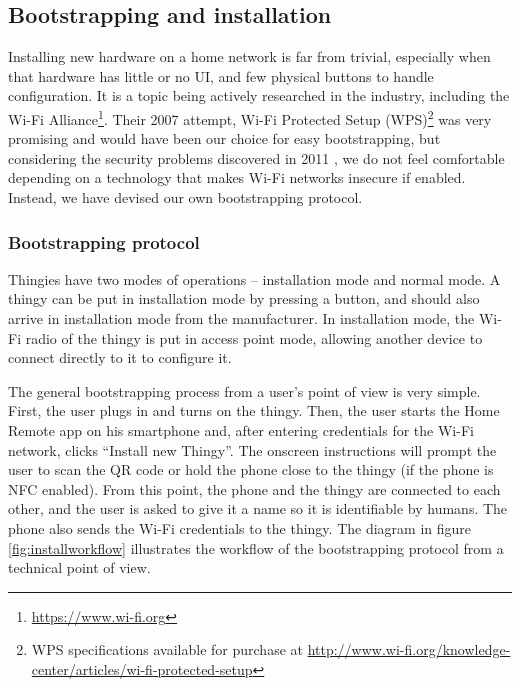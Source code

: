 \documentclass{ubicomp2012}
\begin{document}
\subsection{Bootstrapping and installation}

Installing new hardware on a home network is far from trivial, especially when that hardware has little or no UI, and few physical buttons to handle configuration. It is a topic being actively researched in the industry, including the Wi-Fi Alliance\footnote{\url{https://www.wi-fi.org}}. Their 2007 attempt, Wi-Fi Protected Setup (WPS)\footnote{WPS specifications available for purchase at \url{http://www.wi-fi.org/knowledge-center/articles/wi-fi-protected-setup}\texttrademark} was very promising and would have been our choice for easy bootstrapping, but considering the security problems discovered in 2011 \cite{StefanWPS}, we do not feel comfortable depending on a technology that makes Wi-Fi networks insecure if enabled. Instead, we have devised our own bootstrapping protocol.

\subsubsection{Bootstrapping protocol}

Thingies have two modes of operations -- installation mode and normal mode. A thingy can be put in installation mode by pressing a button, and should also arrive in installation mode from the manufacturer. In installation mode, the Wi-Fi radio of the thingy is put in access point mode, allowing another device to connect directly to it to configure it.

The general bootstrapping process from a user's point of view is very simple. First, the user plugs in and turns on the thingy. Then, the user starts the Home Remote app on his smartphone and, after entering credentials for the Wi-Fi network, clicks ``Install new Thingy''. The onscreen instructions will prompt the user to scan the QR code or hold the phone close to the thingy (if the phone is NFC enabled). From this point, the phone and the thingy are connected to each other, and the user is asked to give it a name so it is identifiable by humans. The phone also sends the Wi-Fi credentials to the thingy. The diagram in figure \ref{fig:installworkflow} illustrates the workflow of the bootstrapping protocol from a technical point of view.
\end{document}
